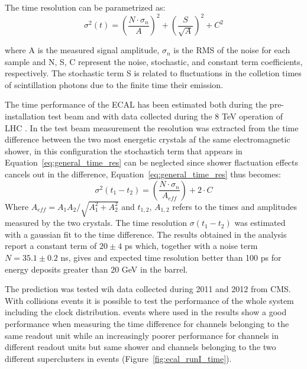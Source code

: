 The time resolution can be parametrized as:
\begin{equation}
  \sigma^2(t) = \left( \frac{N\cdot\sigma_n}{A} \right)^2 + \left( \frac{S}{\sqrt{A}} \right)^2 + C^2  
\end{equation}
\label{eq:general_time_res}

where A is the measured signal amplitude, $\sigma_n$ is the RMS of the noise for each sample and
N, S, C represent the noise, stochastic, and constant term coefficients, respectively.
The stochastic term S is related to fluctuations in the colletion times of scintillation photons due to
the finite time their emission.


The time performance of the ECAL has been estimated both during the pre-installation test beam \cite{ecal_time_reco}
and with data collected during the 8 TeV operation of LHC \cite{delRe_time_ecal}.
In the test beam measurement the resolution was extracted from the time difference between the two most energetic crystals
af the same electromagnetic shower, in this configuration the stochastich term that appears in Equation~\ref{eq:general_time_res}
can be neglected since shower flactuation effects cancels out in the difference, Equation~\ref{eq:general_time_res} thus becomes:
\begin{equation}
  \sigma^2(t_1 - t_2) = \left( \frac{N\cdot\sigma_n}{A_{eff}} \right) + 2 \cdot C
\end{equation}
\label{eq:ecal_time_res}
Where $A_{eff} = A_1A_2/\sqrt{A_1^2+A_2^2}$ and $t_{1,2}$, $A_{1,2}$ refers to the times and amplitudes measured by the two crystals. 
The time resolution $\sigma(t_1-t_2)$ was estimated with a gaussian fit to the time difference.
The results obtained in the analysis report a constant term of $20 \pm 4$ ps which, together with a noise term $N = 35.1\pm 0.2$ ns,
gives and expected time resolution better than 100 ps for energy deposits greater than 20 GeV in the barrel.

The prediction was tested wih data collected during 2011 and 2012 from CMS. With collisions events it is possible to
test the performance of the whole system including the clock distribution. \Zee events where used in \cite{delRe_time_ecal}
the results show a good performance when measuring the time difference for channels belonging to the same readout unit while
an increasingly poorer performance for channels in different readout units but same shower and channels belonging to
the two different superclusters in \Zee events (Figure~\ref{fig:ecal_runI_time}).


